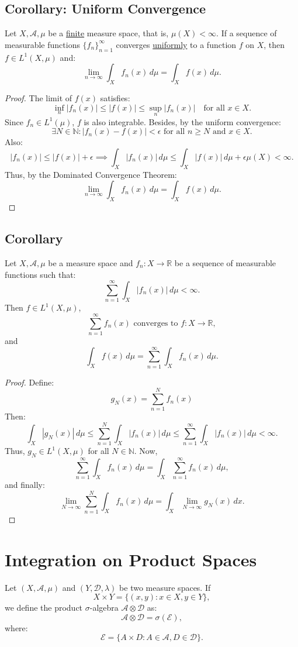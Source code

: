 \documentclass[11pt]{article}
\begin{document}
\subsection{Corollary: Uniform Convergence}
Let \(X, \mathcal{A}, \mu\) be a \underline{finite} measure space, that is, \(\mu(X) < \infty\). If a sequence of measurable functions \(\{f_n\}_{n=1}^{\infty}\) converges \underline{uniformly} to a function \(f\) on \(X\), then \(f \in L^1(X, \mu)\) and:
\[\lim_{n \to \infty} \int_X f_n(x) \,d\mu = \int_X f(x) \,d\mu.\]

\begin{proof}
The limit of \(f(x)\) satisfies:    
\[\inf_n |f_n(x)| \leq |f(x)| \leq \sup_n |f_n(x)| \quad \text{for all } x \in X.\]
Since \(f_n \in L^1(\mu)\), \(f\) is also integrable. Besides, by the uniform convergence:
\[\exists N \in \mathbb{N} : |f_n(x) - f(x)| < \epsilon \text{ for all } n \geq N \text{ and } x \in X.\]
Also:
\[|f_n(x)| \leq |f(x)| + \epsilon \implies \int_X |f_n(x)| \,d\mu \leq \int_X |f(x)| \,d\mu + \epsilon \mu(X) < \infty.\]
Thus, by the Dominated Convergence Theorem:
\[\lim_{n \to \infty} \int_X f_n(x) \,d\mu = \int_X f(x) \,d\mu.\]
\end{proof}

\subsection{Corollary}
Let \(X, \mathcal{A}, \mu\) be a measure space and \(f_n: X \to \mathbb{R}\) be a sequence of measurable functions such that:
\[\sum_{n=1}^{\infty} \int_X |f_n(x)| \,d\mu < \infty.\]
Then \(f \in L^1(X, \mu)\),
\[\sum_{n=1}^{\infty} f_n(x) \text{ converges to } f : X \to \mathbb{R},\]
and
\[\int_X f(x) \,d\mu = \sum_{n=1}^{\infty} \int_X f_n(x) \,d\mu.\]

\begin{proof}
Define:
\[g_N(x) = \sum_{n=1}^{N} f_n(x)\]
Then:
\[\int_X |g_N(x)| \,d\mu \leq \sum_{n=1}^{N} \int_X |f_n(x)| \,d\mu \leq \sum_{n=1}^{\infty} \int_X |f_n(x)| \,d\mu < \infty.\]
Thus, \(g_N \in L^1(X, \mu)\) for all \(N \in \mathbb{N}\). Now, 
\[\sum_{n=1}^{\infty} \int_X f_n(x) \,d\mu = \int_X \sum_{n=1}^{\infty} f_n(x) \,d\mu,\]
and finally:
\[\lim_{N \to \infty} \sum_{n=1}^{N} \int_X f_n(x) \,d\mu = \int_X \lim_{N \to \infty} g_N(x) \,dx.\]
\end{proof}

\section{Integration on Product Spaces}
Let \((X, \mathcal{A}, \mu)\) and \((Y, \mathcal{D}, \lambda)\) be two measure spaces. If
\[X \times Y = \{(x, y) : x \in X, y \in Y\},\]
we define the product \(\sigma\)-algebra \(\mathcal{A} \otimes \mathcal{D}\) as:
\[\mathcal{A} \otimes \mathcal{D} = \sigma (\mathcal{E}),\]
where:
\[\mathcal{E} = \{A \times D : A \in \mathcal{A}, D \in \mathcal{D}\}.\]
\end{document}
